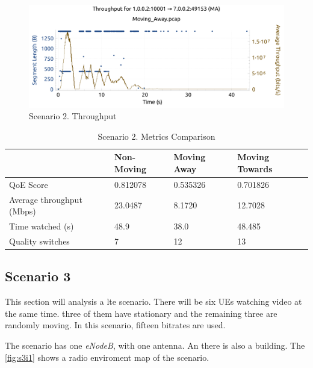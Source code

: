 \begin{figure}[h]
    \centering    
    \includegraphics[width=\textwidth]{img/s2c2_2.pdf}
    \caption{Scenario 2. Throughput}
    \label{fig:s2c2}
\end{figure}


\begin{table}[]
    \centering
    \begin{tabular}{@{}llll@{}}
    \toprule
                              & Non-Moving & Moving Away & Moving Towards \\ \midrule
    QoE Score                 & 0.812078   & 0.535326    & 0.701826       \\
    Average throughput (Mbps) & 23.0487    & 8.1720      & 12.7028        \\
    Time watched (s)          & 48.9       & 38.0        & 48.485         \\
    Quality switches          & 7          & 12          & 13             \\ \bottomrule
    \end{tabular}
    \caption{Scenario 2. Metrics Comparison}
\end{table}



\subsection{Scenario 3}

This section will analysis a lte scenario. There will be six UEs watching video at the same time.
three of them have stationary and the remaining three are randomly moving.
In this scenario, fifteen bitrates are used.

The scenario has one \textit{eNodeB}, with one antenna. An there is also a building. The 
\autoref{fig:s3i1} shows a radio enviroment map of the scenario.


